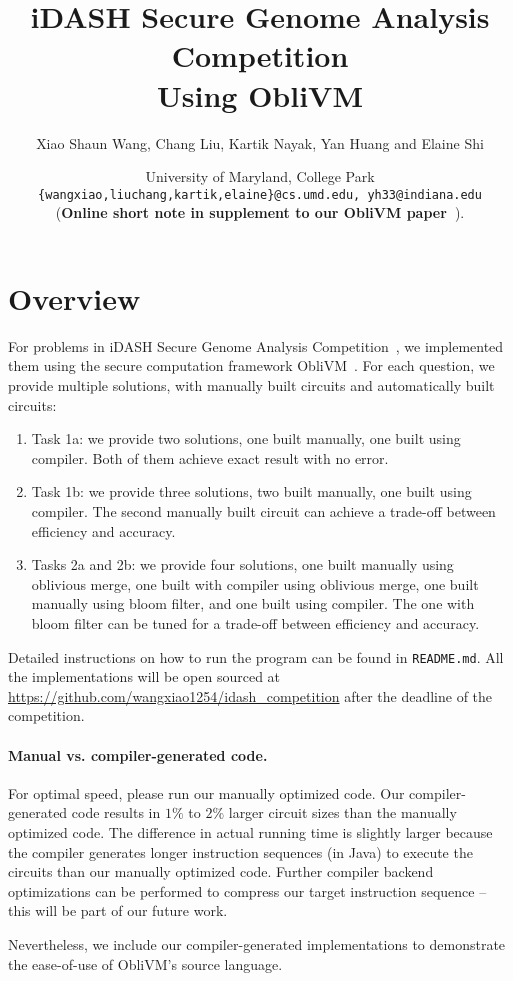\documentclass[11pt]{article}
\title{\bf iDASH Secure Genome Analysis Competition \\
Using {\sf ObliVM}}
\author{Xiao Shaun Wang, Chang Liu, Kartik Nayak, Yan Huang and Elaine Shi}
\date{University of Maryland, College Park\\
{\tt \{wangxiao,liuchang,kartik,elaine\}@cs.umd.edu, yh33@indiana.edu}
\\[10pt]
({\bf Online short note in supplement to our ObliVM paper~\cite{oblivm}}).}
\begin{document}
\maketitle
\section{Overview}
For problems in iDASH Secure Genome Analysis Competition~\cite{idash}, we implemented them using the secure computation framework {\sf ObliVM}~\cite{oblivm, oblivmsite}.
For each question, we provide multiple solutions, with manually built circuits and automatically built circuits:
\begin{enumerate}
\item Task 1a: we provide two solutions, one built manually, one built using compiler. Both of them achieve exact result with no error.
\item Task 1b: we provide three solutions, two built manually, one built using compiler. The second manually built circuit can achieve a trade-off between efficiency and accuracy.
\item Tasks 2a and 2b: we provide four solutions, one built manually using oblivious merge, one built with compiler using oblivious merge, one built manually using bloom filter, and one built using compiler. The one with bloom filter can be tuned for a trade-off between efficiency and accuracy.
\end{enumerate}

Detailed instructions on how to run the program can be found in {\tt README.md}.
All the implementations will be open sourced at \url{https://github.com/wangxiao1254/idash_competition} after the deadline of the competition.



\paragraph{Manual vs. compiler-generated code.}
For optimal speed, please run our manually optimized code. 
Our compiler-generated code  
results in $1\%$ to $2\%$ 
larger circuit sizes than the manually optimized code.
The difference in actual running time is slightly larger
because the compiler generates longer 
instruction sequences (in Java)
to execute the circuits
than our manually optimized code. 
Further compiler backend optimizations can be performed 
to compress our target instruction sequence -- this will 
be part of our future work.

Nevertheless, we include our compiler-generated implementations
to demonstrate the ease-of-use of {\sf ObliVM}'s source language.
\end{document}
